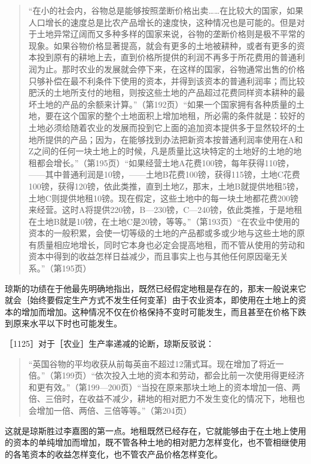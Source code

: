 \begin{quote}{“在小的社会内，谷物总是能够按照垄断价格出卖……在比较大的国家，如果人口增长的速度总是比农产品增长的速度快，这种情况也是可能的。但是对于土地异常辽阔而又多种多样的国家来说，谷物的垄断价格则是极不平常的现象。如果谷物价格显著提高，就会有更多的土地被耕种，或者有更多的资本投到原有的耕地上去，直到价格所提供的利润不再多于所花费用的普通利润为止。那时农业的发展就会停下来，在这样的国家，谷物通常出售的价格只够补偿在最不利条件下使用的资本，并得到该资本的普通利润率；而比较肥沃的土地所支付的地租，则按这些土地的产品超过花费同样资本耕种的最坏土地的产品的余额来计算。”（第192页）“如果一个国家拥有各种质量的土地，要在这个国家的整个土地面积上增加地租，所必需的条件就是：较好的土地必须给随着农业的发展而投到它上面的追加资本提供多于显然较坏的土地所提供的产品；因为，在能够找到办法把新资本按普通利润率使用在A和Z之间的任何一块土地上的时候，凡是质量比这块特定的土地好的土地的地租都会增长。”（第195页）“如果经营土地A花费100镑，每年获得110镑，——其中普通利润是10镑，——土地B花费100镑，获得115镑，土地C花费100镑，获得120镑，依此类推，直到土地Z，那末，土地B就提供地租5镑，土地C则提供地租10镑。现在假定，这些土地中的每一块土地都花费200镑来经营。这时A将提供220镑，B—230镑，C—240镑，依此类推，于是地租在土地B就是10镑，在土地C是20镑，等等。”（第193页）“在农业中使用的资本的一般积累，会使一切等级的土地的产品都或多或少地与这些土地的原有质量相应地增长，同时它本身也必定会提高地租，而不管从使用的劳动和资本中得到的收益怎样日益减少，而且事实上也与其他任何原因毫无关系。”（第195页）}\end{quote}

琼斯的功绩在于他最先明确地指出，既然已经假定地租是存在的，那末一般说来它就会｛始终要假定生产方式不发生任何变革｝由于农业资本，即使用在土地上的资本的增加而增加。这种情况不仅在价格保持不变时可能发生，而且甚至在价格下跌到原来水平以下时也可能发生。

［1125］对于［农业］生产率递减的论断，琼斯反驳说：

\begin{quote}{“英国谷物的平均收获从前每英亩不超过12蒲式耳。现在增加了将近一倍。”（第199页）“依次投入土地的资本和劳动，都会比前一次使用得更经济和更有效。”（第199—200页）“当投在原来那块土地上的资本增加一倍、两倍、三倍时，在收益不减少，耕地的相对肥力不发生变化的情况下，地租也会增加一倍、两倍、三倍等等。”（第204页）}\end{quote}

这就是琼斯胜过李嘉图的第一点。地租既然已经存在，它就能够由于在土地上使用的资本的单纯增加而增加，既不管各种土地的相对肥力怎样变化，也不管相继使用的各笔资本的收益怎样变化，也不管农产品价格怎样变化。

